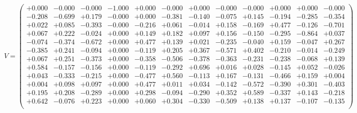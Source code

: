 \documentclass[9pt]{article}
\theoremstyle{plain}
\theoremstyle{definition}
\theoremstyle{remark}
\numberwithin{equation}{section}
\begin{document}
$V = \left(
\begin{array}{
cccccccccccc}
+0.000 & -0.000 & -0.000 & -1.000 & +0.000 & -0.000 & +0.000 & -0.000 & -0.000 & +0.000 & +0.000 & -0.000 \\
-0.208 & -0.699 & +0.179 & -0.000 & +0.000 & -0.381 & -0.140 & -0.075 & +0.145 & -0.194 & -0.285 & -0.354 \\
+0.022 & +0.085 & -0.393 & -0.000 & -0.216 & +0.061 & -0.014 & +0.158 & -0.169 & +0.477 & -0.126 & -0.701 \\
+0.067 & +0.222 & -0.024 & +0.000 & +0.149 & +0.182 & +0.097 & +0.156 & -0.150 & -0.295 & -0.864 & +0.037 \\
-0.074 & -0.374 & -0.672 & +0.000 & +0.477 & +0.139 & +0.021 & -0.235 & -0.040 & +0.159 & -0.047 & +0.267 \\
-0.385 & +0.241 & -0.094 & +0.000 & -0.119 & +0.205 & +0.367 & -0.571 & +0.402 & -0.210 & -0.014 & -0.249 \\
+0.067 & +0.251 & -0.373 & +0.000 & -0.358 & -0.506 & -0.378 & -0.363 & -0.231 & -0.238 & -0.068 & +0.139 \\
+0.584 & -0.157 & -0.156 & +0.000 & -0.119 & -0.292 & +0.696 & +0.016 & +0.028 & -0.145 & +0.052 & -0.026 \\
+0.043 & -0.333 & -0.215 & +0.000 & -0.477 & +0.560 & -0.113 & +0.167 & -0.131 & -0.466 & +0.159 & +0.004 \\
+0.004 & +0.098 & +0.097 & +0.000 & +0.477 & +0.011 & +0.034 & -0.142 & -0.572 & -0.390 & +0.301 & -0.403 \\
+0.195 & +0.208 & -0.289 & +0.000 & +0.298 & -0.094 & -0.290 & +0.352 & +0.589 & -0.337 & +0.143 & -0.218 \\
+0.642 & -0.076 & +0.223 & +0.000 & +0.060 & +0.304 & -0.330 & -0.509 & +0.138 & +0.137 & -0.107 & -0.135 \\
\end{array}
\right)$ \newline 
\end{document}
